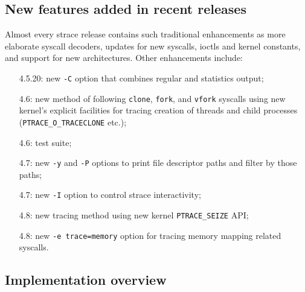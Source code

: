 \documentclass[10pt, a5paper]{article}
\def\v!#1!{\texttt{#1}}
\begin{document}
\subsection*{New features added in recent releases}

Almost every strace release contains such traditional enhancements as  more elaborate syscall decoders, updates for new syscalls, ioctls and kernel constants, and support for new architectures.  Other \linebreak enhancements include:

\begin{itemize}
  \item [4.5.20:] new \v!-C! option that combines regular and statistics output;
  \item [4.6:] new method of following \v!clone!, \v!fork!, and \v!vfork! syscalls using new kernel's explicit facilities for tracing creation of threads and child processes (\v!PTRACE\_O\_TRACECLONE! etc.);
  \item [4.6:] test suite;
  \item [4.7:] new \v!-y! and \v!-P! options to print file descriptor paths and filter by those paths;
  \item [4.7:] new \v!-I! option to control strace interactivity;
  \item [4.8:] new tracing method using new kernel \v!PTRACE\_SEIZE! API;
  \item [4.8:] new \v!-e trace=memory! option for tracing memory mapping related syscalls.
\end{itemize}

\subsection*{Implementation overview}
\end{document}
